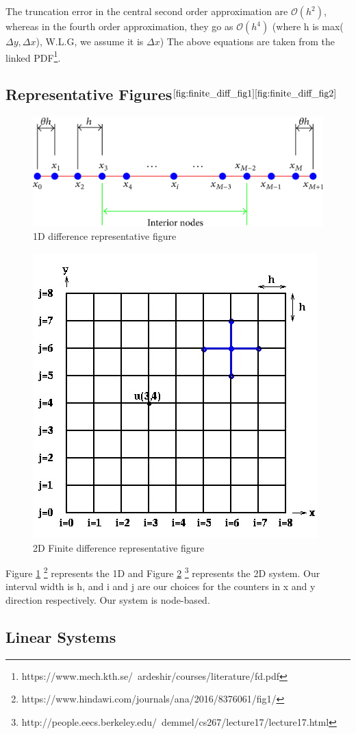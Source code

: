 The truncation error in the central second order approximation are $\mathcal{O}(h^2)$, whereas in the fourth order approximation, they go as $\mathcal{O}(h^4)$ (where h is max($\Delta y, \Delta x$), W.L.G, we assume it is $\Delta x$)
The above equations are taken from the linked PDF\footnote{https://www.mech.kth.se/~ardeshir/courses/literature/fd.pdf}.
\subsection{Representative Figures$^{\ref{fig:finite_diff_fig1} \ref{fig:finite_diff_fig2}}$}
\begin{figure}
    \centering
    \includegraphics[width=0.4\columnwidth]{Figures/1Dheateqn.jpg}
    \caption{1D difference representative figure}
    \label{fig:finite_diff_fig1}
\end{figure}
\begin{figure}
\centering
    \includegraphics[width=0.4\columnwidth]{Figures/2DHeat2.png}
    \caption{2D Finite difference representative figure}
    \label{fig:finite_diff_fig2}
\end{figure}

Figure \ref{fig:finite_diff_fig1} \footnote{https://www.hindawi.com/journals/ana/2016/8376061/fig1/} represents the 1D and Figure \ref{fig:finite_diff_fig2} \footnote{http://people.eecs.berkeley.edu/~demmel/cs267/lecture17/lecture17.html} represents the 2D system. Our interval width is h, and i and j are our choices for the counters in x and y direction respectively. Our system is node-based.

\subsection{Linear Systems}
